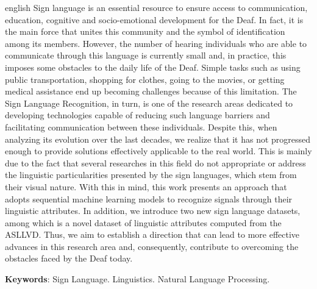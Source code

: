 \begin{resumo}[Abstract]
  \begin{otherlanguage*}{english}
    \noindent
    Sign language is an essential resource to ensure access to communication, education, cognitive and socio-emotional development for the Deaf. In fact, it is the main force that unites this community and the symbol of identification among its members.
    However, the number of hearing individuals who are able to communicate through this language is currently small and, in practice, this imposes some obstacles to the daily life of the Deaf.
    Simple tasks such as using public transportation, shopping for clothes, going to the movies, or getting medical assistance end up becoming challenges because of this limitation.
    The Sign Language Recognition, in turn, is one of the research areas dedicated to developing technologies capable of reducing such language barriers and facilitating communication between these individuals.
    Despite this, when analyzing its evolution over the last decades, we realize that it has not progressed enough to provide solutions effectively applicable to the real world.
    This is mainly due to the fact that several researches in this field do not appropriate or address the linguistic particularities presented by the sign languages, which stem from their visual nature.
    With this in mind, this work presents an approach that adopts sequential machine learning models to recognize signals through their linguistic attributes. In addition, we introduce two new sign language datasets, among which is a novel dataset of linguistic attributes computed from the ASLLVD.
    Thus, we aim to establish a direction that can lead to more effective advances in this research area and, consequently, contribute to overcoming the obstacles faced by the Deaf today.

    \vspace{\onelineskip}

    \noindent
    \textbf{Keywords}: Sign Language. Linguistics. Natural Language Processing.
  \end{otherlanguage*}
\end{resumo}
